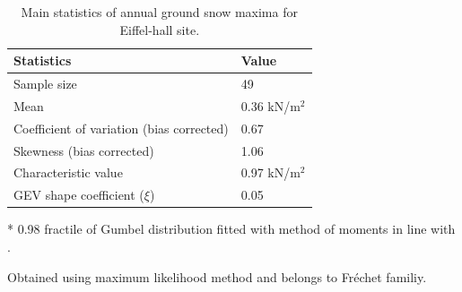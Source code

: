 \begin{table}
\caption{Main statistics of annual ground snow maxima for Eiffel-hall site.}
\centering
\label{tab:eiffel_snow}
\small
	\begin{threeparttable}
    \begin{tabular}{m{}  m{}}
    \toprule
    Statistics  & Value \\
    \midrule
    \rowcolor{lightgrey} Sample size & 49 \\
    Mean & 0.36 kN/m$^2$ \\
    \rowcolor{lightgrey} Coefficient of variation (bias corrected) & 0.67 \\
    Skewness (bias corrected) & 1.06 \\
    \rowcolor{lightgrey} Characteristic value\tnote{*} & 0.97 kN/m$^2$ \\
    GEV shape coefficient ($\xi$)\tnote{\textdagger} & 0.05 \\
    \bottomrule
    \end{tabular}
    \begin{tablenotes}
    	\item[*] 0.98 fractile of Gumbel distribution fitted with method of moments in line with \citet{Sanpaolesi1998}.
	    \item[\textdagger] Obtained using maximum likelihood method and belongs to Fréchet familiy.  
   	\end{tablenotes}
   	\end{threeparttable}
\end{table}


